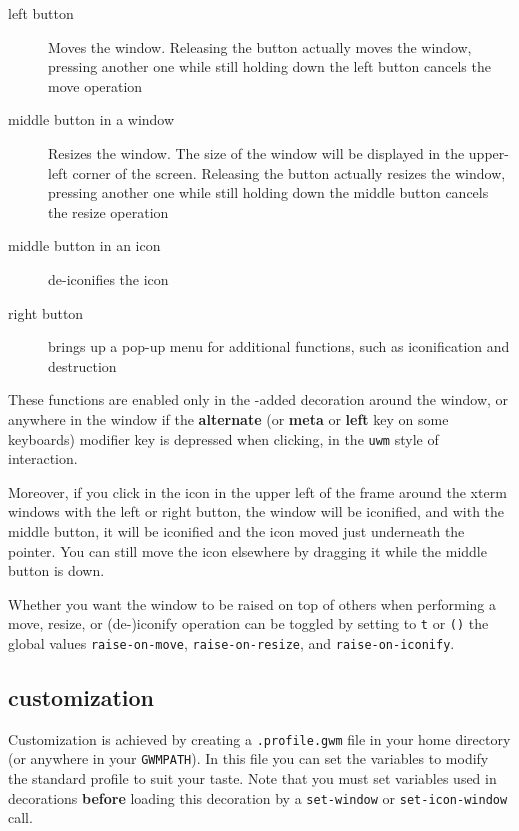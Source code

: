 \begin{description}

\item[left button] Moves the window. Releasing the button actually moves the
window, pressing another one while still holding down the left button
cancels the move operation

\item[middle button in a window] Resizes the window. The size of the window
will be displayed in the upper-left corner of the screen. Releasing the
button actually resizes the window, pressing another one while still holding
down the middle button cancels the resize operation

\item[middle button in an icon] de-iconifies the icon

\item[right button] brings up a pop-up menu for additional functions, such
as iconification and destruction

\end{description} 

These functions are enabled only in the {\GWM}-added decoration around the
window, or anywhere in the window if the {\bf alternate} (or {\bf meta} or
{\bf left} key on some keyboards) modifier key is depressed when clicking,
in the \verb"uwm" style of interaction.

Moreover, if you click in the icon in the upper left of the frame around the
xterm windows with the left or right button, the window will be iconified,
and with the middle button, it will be iconified and the icon moved just
underneath the pointer. You can still move the icon elsewhere by
dragging it while the middle button is down.

Whether you want the window to be raised on top of others when performing a
move, resize, or (de-)iconify operation can be toggled by setting to \verb|t|
or \verb|()| the global values \verb|raise-on-move|, \verb|raise-on-resize|,
and \verb|raise-on-iconify|.\label{raise-on-move}

\subsection{customization}

Customization is achieved by creating a \verb".profile.gwm" file in
your home directory (or anywhere in your \verb"GWMPATH"). In this file
you can set the variables to modify the standard profile to suit your
taste. Note that you must set variables used in decorations {\bf
before} loading this decoration by a \verb"set-window" or
\verb"set-icon-window" call.

